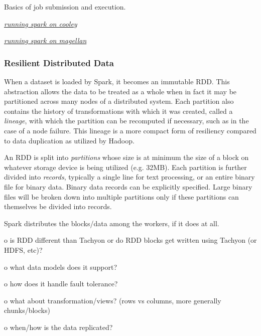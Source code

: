 Basics of job submission and execution.

\href{https://docs.google.com/document/d/1fq3z1-oEcCBhjKA__vl8LsVm3-uArJik7YFLYvYoN1Y/edit?usp=sharing}{\emph{running
spark on cooley}}

\href{https://docs.google.com/document/d/1lyzEHap1EznES0DKiMa3fsalepqPD6vnbZqSEMjCVPQ/edit?usp=sharing}{\emph{running
spark on magellan}}

\subsubsection{Resilient Distributed
Data}\label{resilient-distributed-data}

When a dataset is loaded by Spark, it becomes an immutable RDD. This
abstraction allows the data to be treated as a whole when in fact it may
be partitioned across many nodes of a distributed system. Each partition
also contains the history of transformations with which it was created,
called a \emph{lineage}, with which the partition can be recomputed if
necessary, such as in the case of a node failure. This lineage is a more
compact form of resiliency compared to data duplication as utilized by
Hadoop.

An RDD is split into \emph{partitions} whose size is at minimum the size
of a block on whatever storage device is being utilized (e.g. 32MB).
Each partition is further divided into \emph{records}, typically a
single line for text processing, or an entire binary file for binary
data. Binary data records can be explicitly specified. Large binary
files will be broken down into multiple partitions only if these
partitions can themselves be divided into records.

Spark distributes the blocks/data among the workers, if it does at all.

o is RDD different than Tachyon or do RDD blocks get written using
Tachyon (or HDFS, etc)?

o what data models does it support?

o how does it handle fault tolerance?

o what about transformation/views? (rows vs columns, more generally
chunks/blocks)

o when/how is the data replicated?

\subsubsection{}\label{section}

